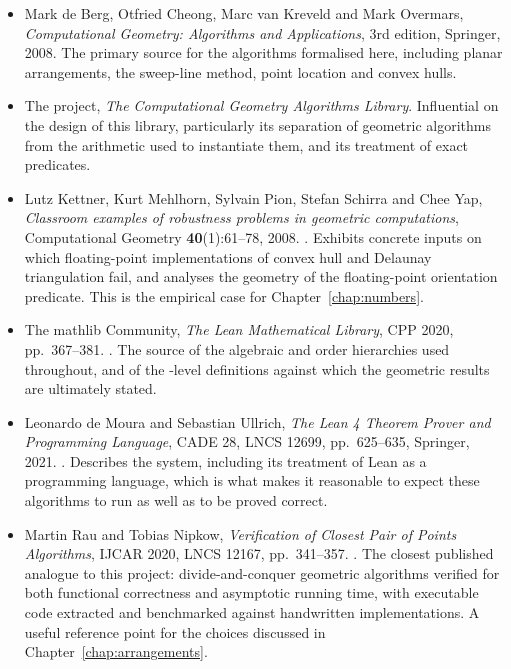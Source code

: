 \begin{itemize}
\item Mark de Berg, Otfried Cheong, Marc van Kreveld and Mark Overmars,
  \emph{Computational Geometry: Algorithms and Applications}, 3rd edition,
  Springer, 2008. The primary source for the algorithms formalised here,
  including planar arrangements, the sweep-line method, point location and
  convex hulls.

\item The  project, \emph{The Computational
  Geometry Algorithms Library}. Influential on the design of this library,
  particularly its separation of geometric algorithms from the arithmetic
  used to instantiate them, and its treatment of exact predicates.

\item Lutz Kettner, Kurt Mehlhorn, Sylvain Pion, Stefan Schirra and Chee Yap,
  \emph{Classroom examples of robustness problems in geometric computations},
  Computational Geometry \textbf{40}(1):61--78, 2008.
  .
  Exhibits concrete inputs on which floating-point implementations of convex
  hull and Delaunay triangulation fail, and analyses the geometry of the
  floating-point orientation predicate. This is the empirical case for
  Chapter~\ref{chap:numbers}.

\item The mathlib Community, \emph{The Lean Mathematical Library}, CPP 2020,
  pp.\ 367--381.
  .
  The source of the algebraic and order hierarchies used throughout, and of the
  -level definitions against which the geometric results are
  ultimately stated.

\item Leonardo de Moura and Sebastian Ullrich, \emph{The Lean 4 Theorem Prover
  and Programming Language}, CADE 28, LNCS 12699, pp.\ 625--635, Springer, 2021.
  .
  Describes the system, including its treatment of Lean as a programming
  language, which is what makes it reasonable to expect these algorithms to run
  as well as to be proved correct.

\item Martin Rau and Tobias Nipkow, \emph{Verification of Closest Pair of Points
  Algorithms}, IJCAR 2020, LNCS 12167, pp.\ 341--357.
  .
  The closest published analogue to this project: divide-and-conquer geometric
  algorithms verified for both functional correctness and asymptotic running
  time, with executable code extracted and benchmarked against handwritten
  implementations. A useful reference point for the choices discussed in
  Chapter~\ref{chap:arrangements}.


\end{itemize}
